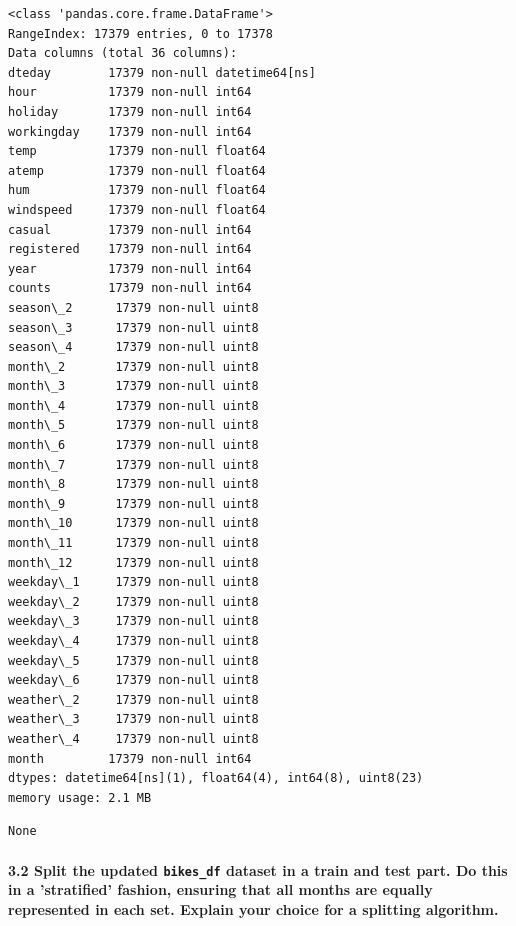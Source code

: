 \documentclass[11pt]{article}
\begin{document}
    
    \begin{Verbatim}[commandchars=\\\{\}]
<class 'pandas.core.frame.DataFrame'>
RangeIndex: 17379 entries, 0 to 17378
Data columns (total 36 columns):
dteday        17379 non-null datetime64[ns]
hour          17379 non-null int64
holiday       17379 non-null int64
workingday    17379 non-null int64
temp          17379 non-null float64
atemp         17379 non-null float64
hum           17379 non-null float64
windspeed     17379 non-null float64
casual        17379 non-null int64
registered    17379 non-null int64
year          17379 non-null int64
counts        17379 non-null int64
season\_2      17379 non-null uint8
season\_3      17379 non-null uint8
season\_4      17379 non-null uint8
month\_2       17379 non-null uint8
month\_3       17379 non-null uint8
month\_4       17379 non-null uint8
month\_5       17379 non-null uint8
month\_6       17379 non-null uint8
month\_7       17379 non-null uint8
month\_8       17379 non-null uint8
month\_9       17379 non-null uint8
month\_10      17379 non-null uint8
month\_11      17379 non-null uint8
month\_12      17379 non-null uint8
weekday\_1     17379 non-null uint8
weekday\_2     17379 non-null uint8
weekday\_3     17379 non-null uint8
weekday\_4     17379 non-null uint8
weekday\_5     17379 non-null uint8
weekday\_6     17379 non-null uint8
weather\_2     17379 non-null uint8
weather\_3     17379 non-null uint8
weather\_4     17379 non-null uint8
month         17379 non-null int64
dtypes: datetime64[ns](1), float64(4), int64(8), uint8(23)
memory usage: 2.1 MB

    \end{Verbatim}

    
    \begin{verbatim}
None
    \end{verbatim}

    
    \paragraph{\texorpdfstring{\textbf{3.2} Split the updated
\texttt{bikes\_df} dataset in a train and test part. Do this in a
'stratified' fashion, ensuring that all months are equally represented
in each set. Explain your choice for a splitting
algorithm.}{3.2 Split the updated bikes\_df dataset in a train and test part. Do this in a 'stratified' fashion, ensuring that all months are equally represented in each set. Explain your choice for a splitting algorithm.}}\label{split-the-updated-bikes_df-dataset-in-a-train-and-test-part.-do-this-in-a-stratified-fashion-ensuring-that-all-months-are-equally-represented-in-each-set.-explain-your-choice-for-a-splitting-algorithm.}
\end{document}

